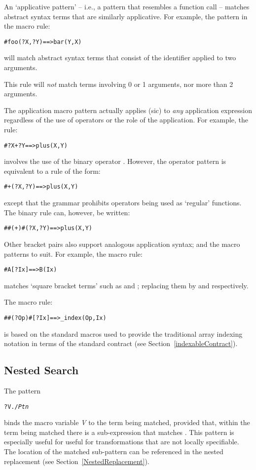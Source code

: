 An `applicative pattern' -- i.e., a pattern that resembles a function call -- matches abstract syntax terms that are similarly applicative. For example, the pattern in the macro rule:
\begin{alltt}
\# foo(?X,?Y) ==> bar(Y,X)
\end{alltt}
will match abstract syntax terms that consist of the identifier  applied to two arguments.
\begin{aside}
This rule will \emph{not} match  terms involving 0 or 1 arguments, nor more than 2 arguments.
\end{aside}
\begin{aside}
The application macro pattern actually applies (sic) to \emph{any} application expression regardless of the use of operators or the role of the application. For example, the rule:
\begin{alltt}
\# ?X + ?Y ==> plus(X,Y)
\end{alltt}
involves the use of the binary operator \q{+}. However, the operator pattern is equivalent to a rule of the form:
\begin{alltt}
\# +(?X,?Y) ==> plus(X,Y)
\end{alltt}
except that the grammar prohibits operators being used as `regular' functions. The binary \q{+} rule can, however, be written:
\begin{alltt}
\# \#(+)\#(?X,?Y) ==> plus(X,Y)
\end{alltt}
\end{aside}

\noindent
Other bracket pairs also support analogous application syntax; and the macro patterns to suit. For example, the macro rule:
\begin{alltt}
\# A[?Ix] ==> B(Ix)
\end{alltt}
matches `square bracket terms' such as  and ; replacing them by  and  respectively.

The macro rule:
\begin{alltt}
\# #(?Op)#[?Ix] ==> \_index(Op,Ix)
\end{alltt}
is based on the standard macros used to provide the traditional array indexing notation in terms of the standard  contract (see Section~\vref{indexableContract}).

\subsection{Nested Search}
The pattern
\begin{alltt}
?V./\emph{Ptn}
\end{alltt}
binds the macro variable \emph{V} to the term being matched, provided that, within the term being matched there is a sub-expression that matches . This pattern is especially useful for useful for transformations that are not locally specifiable. The location of the matched sub-pattern can be referenced in the nested replacement (see Section~\vref{NestedReplacement}).

